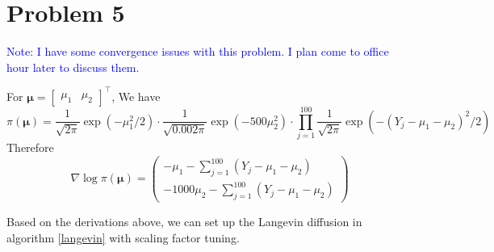 \documentclass[12pt]{article}
\begin{document}
\section*{Problem 5}

\textcolor{blue}{Note: I have some convergence issues with this problem. I plan come to office hour later to discuss them.}

 For $\bm{\mu} = \begin{bmatrix}\mu_1 & \mu_2\end{bmatrix}^\top$, We have 
 \[ \pi (\bm{\mu}) = \frac{1}{\sqrt{2\pi}} \exp\left( -\mu_1^2/2\right)\cdot \frac{1}{\sqrt{0.002\pi}}\exp\left( -500\mu_2^2\right)\cdot \prod_{j=1}^{100}\frac{1}{\sqrt{2\pi}} \exp \left(-(Y_j - \mu_1 - \mu_2)^2 / 2 \right)  \] 
Therefore
\[ \nabla \log \pi(\bm{\mu}) = \begin{pmatrix}
	-\mu_1 - \sum_{j=1}^{100}(Y_j - \mu_1 - \mu_2) \\
	-1000 \mu_2 - \sum_{j=1}^{100}(Y_j - \mu_1 - \mu_2)
 \end{pmatrix} \]

Based on the derivations above, we can set up the Langevin diffusion in algorithm \ref{langevin} with scaling factor tuning. 
\end{document}
